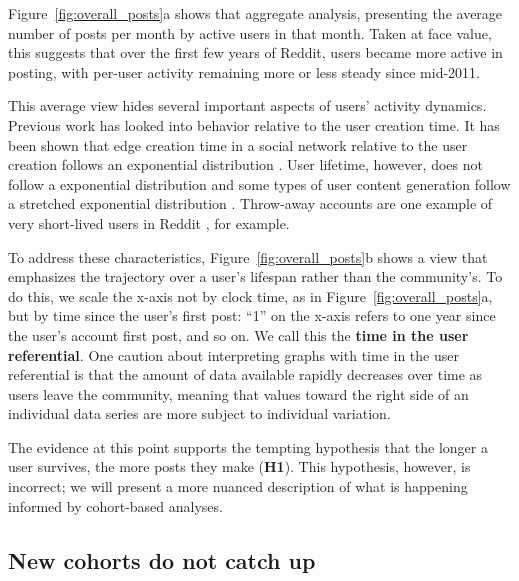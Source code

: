 Figure~\ref{fig:overall_posts}a shows that aggregate analysis, presenting the average number of posts per month by active users in that month.  Taken at face value, this 
suggests that over the first few years of Reddit, users became more active in posting, with per-user activity remaining more or less steady since mid-2011.


This average view hides several important aspects of users' activity dynamics. Previous work has looked into behavior relative to the user creation time. It has been shown that edge creation time in a social network relative to the user creation follows an exponential distribution \cite{Tomkins2008}. User lifetime, however, does not follow a exponential distribution and some types of user content generation follow a stretched exponential distribution \cite{Guo2009}. Throw-away accounts are one example of very short-lived users in Reddit \cite{Bergstrom2011}, for example. 

To address these characteristics, Figure~\ref{fig:overall_posts}b shows a view that emphasizes the trajectory over a user's lifespan rather than the community's.  To do this, we scale the x-axis not by clock time, as in Figure~\ref{fig:overall_posts}a, but by time since the user's first post: ``1'' on the x-axis refers to one year since the user's account first post, and so on. We call this the \textbf{time in the user referential}. One caution about interpreting graphs with time in the user referential is that the amount of data available rapidly decreases over time as users leave the community, meaning that values toward the right side of an individual data series are more subject to individual variation.  

The evidence at this point supports the tempting hypothesis that the longer a user survives, the more posts they make (\textbf{H1}).  This hypothesis, however, is incorrect; we will present a more nuanced description of what is happening informed by cohort-based analyses.

\subsection{New cohorts do not catch up}

